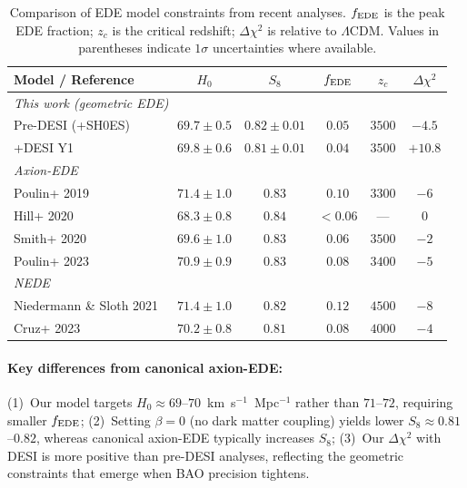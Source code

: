 \documentclass[a4paper,11pt]{article}
\begin{document}
\begin{table}[ht]
\centering
\caption{Comparison of EDE model constraints from recent analyses. $f_{\rm EDE}$ is the peak EDE fraction; $z_c$ is the critical redshift; $\Delta\chi^2$ is relative to $\Lambda$CDM. Values in parentheses indicate $1\sigma$ uncertainties where available.}
\label{tab:ede_comparison}
\begin{tabular}{lccccc}
\toprule
\textbf{Model / Reference} & $H_0$ & $S_8$ & $f_{\rm EDE}$ & $z_c$ & $\Delta\chi^2$ \\
\midrule
\multicolumn{6}{l}{\textit{This work (geometric EDE)}} \\
\quad Pre-DESI (+SH0ES) & $69.7 \pm 0.5$ & $0.82 \pm 0.01$ & $0.05$ & $3500$ & $-4.5$ \\
\quad +DESI Y1 & $69.8 \pm 0.6$ & $0.81 \pm 0.01$ & $0.04$ & $3500$ & $+10.8$ \\
\midrule
\multicolumn{6}{l}{\textit{Axion-EDE}} \\
\quad Poulin+ 2019~\cite{Poulin_EDE} & $71.4 \pm 1.0$ & $0.83$ & $0.10$ & $3300$ & $-6$ \\
\quad Hill+ 2020~\cite{Hill2020} & $68.3 \pm 0.8$ & $0.84$ & $<0.06$ & --- & $0$ \\
\quad Smith+ 2020~\cite{Smith2020} & $69.6 \pm 1.0$ & $0.83$ & $0.06$ & $3500$ & $-2$ \\
\quad Poulin+ 2023~\cite{Poulin2023} & $70.9 \pm 0.9$ & $0.83$ & $0.08$ & $3400$ & $-5$ \\
\midrule
\multicolumn{6}{l}{\textit{NEDE}} \\
\quad Niedermann \& Sloth 2021~\cite{Niedermann_NewEDE} & $71.4 \pm 1.0$ & $0.82$ & $0.12$ & $4500$ & $-8$ \\
\quad Cruz+ 2023 & $70.2 \pm 0.8$ & $0.81$ & $0.08$ & $4000$ & $-4$ \\
\bottomrule
\end{tabular}
\end{table}

\paragraph{Key differences from canonical axion-EDE:}
(1)~Our model targets $H_0 \approx 69$--$70$~km~s$^{-1}$~Mpc$^{-1}$ rather than $71$--$72$, requiring smaller $f_{\rm EDE}$;
(2)~Setting $\beta = 0$ (no dark matter coupling) yields lower $S_8 \approx 0.81$--$0.82$, whereas canonical axion-EDE typically increases $S_8$;
(3)~Our $\Delta\chi^2$ with DESI is more positive than pre-DESI analyses, reflecting the geometric constraints that emerge when BAO precision tightens.
\end{document}
